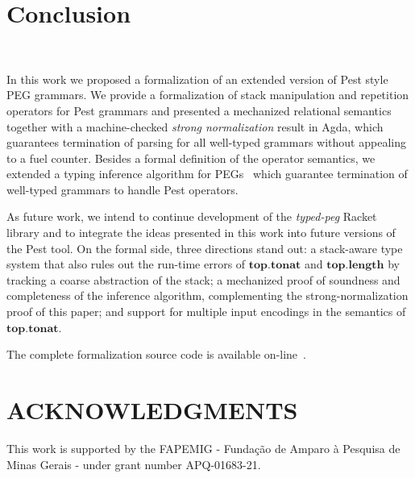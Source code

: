 \documentclass[preprint,12pt]{elsarticle}
\theoremstyle{definition}
\begin{document}
\section{Conclusion}~\label{sec:conclusion}

In this work we proposed a formalization of an extended version of Pest style PEG
grammars. We provide a formalization of stack manipulation and repetition operators
for Pest grammars and presented a mechanized relational semantics together with a
machine-checked \emph{strong normalization} result in Agda, which guarantees
termination of parsing for all well-typed grammars without appealing to a fuel
counter.
Besides a formal definition of the operator semantics, we
extended a typing inference algorithm for PEGs~\cite{Cardoso23} which guarantee
termination of well-typed grammars to handle Pest operators.

As future work, we intend to continue development of the \emph{typed-peg} Racket
library and to integrate the ideas presented in this work into future versions of
the Pest tool. On the formal side, three directions stand out: a stack-aware type
system that also rules out the run-time errors of $\mathbf{top.tonat}$ and
$\mathbf{top.length}$ by tracking a coarse abstraction of the stack; a mechanized
proof of soundness and completeness of the inference algorithm, complementing the
strong-normalization proof of this paper; and support for multiple input
encodings in the semantics of $\mathbf{top.tonat}$.

The complete formalization source code is available on-line~\cite{pegrepository}.

\section*{ACKNOWLEDGMENTS}
This work is supported by the FAPEMIG - Fundação de Amparo à Pesquisa de Minas Gerais -
under grant number APQ-01683-21.






\end{document}
